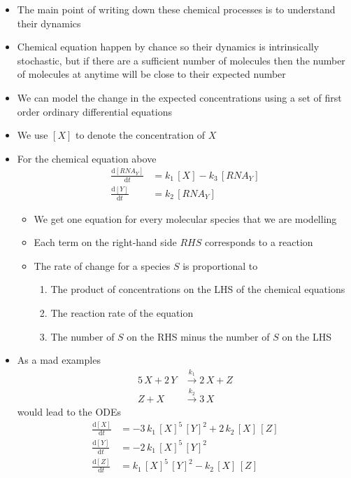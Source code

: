 \documentclass[11pt]{article}
\newcommand{\dd}{\mathrm{d}}
\newcommand{\RNA}{\mathit{RNA}}
\begin{document}
\begin{itemize}
\begin{itemize}
\item (\ref{eq:YRNAY}) \(\RNA_Y\)  is  translated to protein \(Y\) at a
rate \(k_2\) (this is also a catalytic reaction that does not
change \(\RNA_{Y}\))
\item (\ref{eq:YRNA0}) Describes the breakdown of \(RNA_{Y}\) at a rate \(k_3\)
\item All these equations are shorthand for complex processes
\end{itemize}
\item The main point of writing down these chemical processes is to
understand their dynamics
\item Chemical equation happen by chance so their dynamics is
intrinsically stochastic, but if there are a sufficient number of
molecules then the number of molecules at anytime will be close
to their expected number
\item We can model the change in the expected concentrations using a set of first
order ordinary differential equations
\item We use \([X]\) to denote the concentration of \(X\)
\item For the chemical equation above
\begin{align*}
\frac{\dd [\RNA_Y]}{\dd t} &= k_1 \, [X] - k_3\,  [\RNA_Y] \\
\frac{\dd [Y]}{\dd t} &= k_2 \, [\RNA_Y]
\end{align*}
\begin{itemize}
\item We get one equation for every molecular species that we are modelling
\item Each term on the right-hand side \(RHS\) corresponds to a reaction
\item The rate of change for a species \(S\) is proportional to
\begin{enumerate}
\item The product of concentrations on the LHS of the chemical equations
\item The reaction rate of the equation
\item The number of \(S\) on the RHS minus the number of \(S\) on the LHS
\end{enumerate}
\end{itemize}
\item As a mad examples
\begin{align*}
5 \,X + 2\, Y &\stackrel{k_1}{\longrightarrow} 2\, X + Z \\
Z + X &\stackrel{k_2}{\longrightarrow} 3\, X
\end{align*}
would lead to the ODEs
\begin{align*}
\frac{\dd [X]}{\dd t} &= -3\,k_1\, [X]^5 \, [Y]^2 + 2 \, k_2 \, [X]\,[Z] \\
\frac{\dd [Y]}{\dd t} &= -2\,k_1\, [X]^5 \, [Y]^2 \\
\frac{\dd [Z]}{\dd t} &= k_{1}\, [X]^5 \, [Y]^2 - k_2 \, [X]\,[Z]
\end{align*}
\end{itemize}
\end{document}
